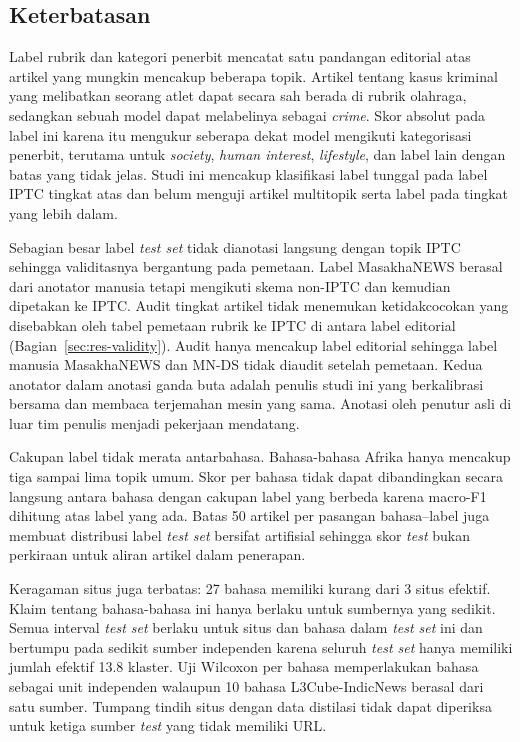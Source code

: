\documentclass{ieeeaccess}
\newcommand{\en}[1]{\textit{#1}}
\begin{document}
\subsection{Keterbatasan}
\label{sec:limitations}
Label rubrik dan kategori penerbit mencatat satu pandangan editorial atas artikel yang mungkin mencakup beberapa topik. Artikel tentang kasus kriminal yang melibatkan seorang atlet dapat secara sah berada di rubrik olahraga, sedangkan sebuah model dapat melabelinya sebagai \emph{crime}. Skor absolut pada label ini karena itu mengukur seberapa dekat model mengikuti kategorisasi penerbit, terutama untuk \emph{society}, \emph{human interest}, \emph{lifestyle}, dan label lain dengan batas yang tidak jelas. Studi ini mencakup klasifikasi label tunggal pada label IPTC tingkat atas dan belum menguji artikel multitopik serta label pada tingkat yang lebih dalam.

Sebagian besar label \en{test set} tidak dianotasi langsung dengan topik IPTC sehingga validitasnya bergantung pada pemetaan. Label MasakhaNEWS berasal dari anotator manusia tetapi mengikuti skema non-IPTC dan kemudian dipetakan ke IPTC. Audit tingkat artikel tidak menemukan ketidakcocokan yang disebabkan oleh tabel pemetaan rubrik ke IPTC di antara label editorial (Bagian~\ref{sec:res-validity}). Audit hanya mencakup label editorial sehingga label manusia MasakhaNEWS dan MN-DS tidak diaudit setelah pemetaan. Kedua anotator dalam anotasi ganda buta adalah penulis studi ini yang berkalibrasi bersama dan membaca terjemahan mesin yang sama. Anotasi oleh penutur asli di luar tim penulis menjadi pekerjaan mendatang.

Cakupan label tidak merata antarbahasa. Bahasa-bahasa Afrika hanya mencakup tiga sampai lima topik umum. Skor per bahasa tidak dapat dibandingkan secara langsung antara bahasa dengan cakupan label yang berbeda karena macro-F1 dihitung atas label yang ada. Batas 50 artikel per pasangan bahasa--label juga membuat distribusi label \en{test set} bersifat artifisial sehingga skor \en{test} bukan perkiraan untuk aliran artikel dalam penerapan.

Keragaman situs juga terbatas: 27 bahasa memiliki kurang dari 3 situs efektif. Klaim tentang bahasa-bahasa ini hanya berlaku untuk sumbernya yang sedikit. Semua interval \en{test set} berlaku untuk situs dan bahasa dalam \en{test set} ini dan bertumpu pada sedikit sumber independen karena seluruh \en{test set} hanya memiliki jumlah efektif 13.8 klaster. Uji Wilcoxon per bahasa memperlakukan bahasa sebagai unit independen walaupun 10 bahasa L3Cube-IndicNews berasal dari satu sumber. Tumpang tindih situs dengan data distilasi tidak dapat diperiksa untuk ketiga sumber \en{test} yang tidak memiliki URL.
\end{document}
